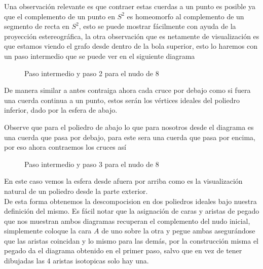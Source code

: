 Una observación relevante es que contraer estas cuerdas a un punto es posible ya que el complemento de un punto en $S^2$ es homeomorfo al complemento de un segmento de recta en $S^2$, esto se puede mostrar fácilmente con ayuda de la proyección estereográfica, la otra observación que es netamente de visualización es que estamos viendo el grafo desde dentro de la bola superior, esto lo haremos con un paso intermedio que se puede ver en el siguiente diagrama
\begin{figure}[H]
    \centering
    
    \caption{Paso intermedio y paso 2 para el nudo de 8}
\end{figure}
\begin{block}
    De manera similar a antes contraiga ahora cada cruce por debajo como si fuera una cuerda continua a un punto, estos serán los vértices ideales del poliedro inferior, dado por la esfera de abajo.
\end{block}
Observe que para el poliedro de abajo lo que para nosotros desde el diagrama es una cuerda que pasa por debajo, para este sera una cuerda que pasa por encima, por eso ahora contraemos los cruces así
\begin{figure}[H]
    \centering
    
    \caption{Paso intermedio y paso 3 para el nudo de 8}
\end{figure}
En este caso vemos la esfera desde afuera por arriba como es la visualización natural de un poliedro desde la parte exterior.\\

De esta forma obtenemos la descompocision en dos poliedros ideales bajo nuestra definición del mismo. Es fácil notar que la asignación de caras y aristas de pegado que nos muestran ambos diagramas recuperan el complemento del nudo inicial, simplemente coloque la cara $A$ de uno sobre la otra y pegue ambas asegurándose que las aristas coincidan y lo mismo para las demás, por la construcción misma el pegado da el diagrama obtenido en el primer paso, salvo que en vez de tener dibujadas las 4 aristas isotopicas solo hay una.


